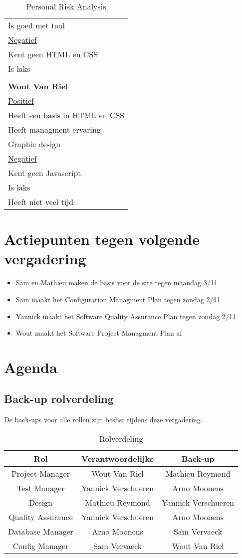 \begin{longtable}{l}
  Is goed met taal \\
  \underline{Negatief} \\
  Kent geen HTML en CSS \\
  Is laks \\
\\
  \textbf{Wout Van Riel} \\
  \hline
  \underline{Positief} \\
  Heeft een basis in HTML en CSS \\
  Heeft managment ervaring \\
  Graphic design \\
  \underline{Negatief} \\
  Kent geen Javascript \\
  Is laks \\
  Heeft niet veel tijd 
 
\caption{Personal Risk Analysis}
\label{tab:pra}
\end{longtable}

\section{Actiepunten tegen volgende vergadering}
\begin{itemize}
\item Sam en Mathieu maken de basis voor de site tegen maandag 3/11
\item Sam maakt het Configuration Managment Plan tegen zondag 2/11
\item Yannick maakt het Software Quality Assurance Plan tegen zondag 2/11
\item Wout maakt het Software Project Managment Plan af
\end{itemize}

\section{Agenda}
\subsection{Back-up rolverdeling}
De back-ups voor alle rollen zijn beslist tijdens deze vergadering.
\begin{table}[h]
\centering
\begin{tabular}{c|c|c}
\textbf{Rol} & \textbf{Verantwoordelijke} & \textbf{Back-up}  \\
\hline
 Project Manager & Wout Van Riel & Mathieu Reymond \\
 Test Manager & Yannick Verschueren & Arno Moonens \\
 Design & Mathieu Reymond & Yannick Verschueren \\
 Quality Assurance & Yannick Verschueren & Arno Moonens \\
 Database Manager & Arno Moonens & Sam Vervaeck \\
 Config Manager & Sam Vervaeck & Wout Van Riel 
\end{tabular}
\caption{Rolverdeling}
\label{tab:rolverdeling}
\end{table}

